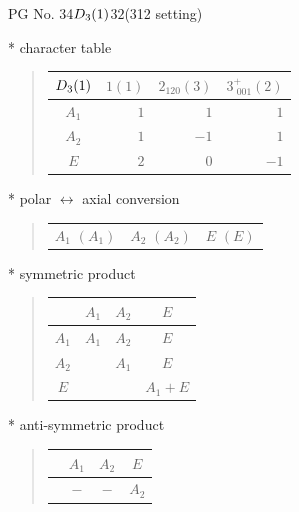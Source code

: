 \documentclass[fleqn,8pt,landscape]{jsarticle}
\begin{document}
\setcounter{MaxMatrixCols}{32}

\renewcommand{\tablename}{Table~}
\renewcommand{\figurename}{Figure~}
\begin{center}
\LARGE
PG No. 34\quad$D_{\rm 3}(1)$\quad$32$\quad(312 setting)\quad[ trigonal ]
\end{center}

* character table
\begin{quote}
\begin{tabular}{crrr} \hline \hline
$ D_{\rm 3}(1) $ & $ 1(1) $ & $ 2{}_{120}(3) $ & $ 3^{+}_{\,\,001}(2) $ \\ \hline
$ A_{1} $ & $ 1 $ & $ 1 $ & $ 1 $ \\
$ A_{2} $ & $ 1 $ & $ -1 $ & $ 1 $ \\
$ E $ & $ 2 $ & $ 0 $ & $ -1 $ \\
 \hline \hline
\end{tabular}
\end{quote}

* polar $\leftrightarrow$ axial conversion
\begin{quote}
\begin{tabular}{ccc}
$ A_{1}\,\,(A_{1}) $ & $ A_{2}\,\,(A_{2}) $ & $ E\,\,(E) $
\end{tabular}
\end{quote}

* symmetric product
\begin{quote}
\begin{tabular}{c|ccc} \hline \hline
 & $ A_{1} $ & $ A_{2} $ & $ E $ \\ \hline
$ A_{1} $ & $ A_{1} $ & $ A_{2} $ & $ E $ \\
$ A_{2} $ & $  $ & $ A_{1} $ & $ E $ \\
$ E $ & $  $ & $  $ & $ A_{1} + E $ \\
 \hline \hline
\end{tabular}
\end{quote}

* anti-symmetric product
\begin{quote}
\begin{tabular}{cccc} \hline \hline
 & $ A_{1} $ & $ A_{2} $ & $ E $ \\ \hline
$  $ & $ - $ & $ - $ & $ A_{2} $ \\
 \hline \hline
\end{tabular}
\end{quote}
\end{document}
